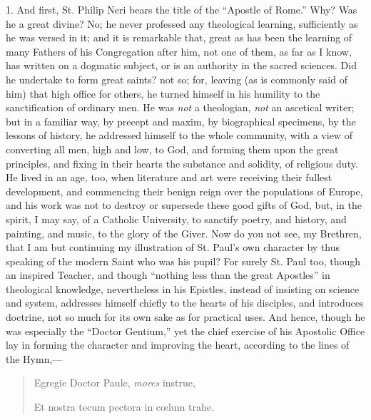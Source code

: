 1. And first, St. Philip Neri bears the title of the
``Apostle of Rome.'' Why? Was he a great divine?
No; he never professed any theological learning,
sufficiently as he was versed in it; and it is remarkable
that, great as has been the learning of many Fathers of
his Congregation after him, not one of them, as far as I
know, has written on a dogmatic subject, or is an
authority in the sacred sciences. Did he undertake to
form great saints? not so; for, leaving (as is commonly
said of him) that high office for others, he turned
himself in his humility to the sanctification of ordinary
men. He was \emph{not} a theologian, \emph{not} an
ascetical writer; but in a familiar way, by precept and
maxim, by biographical specimens, by the lessons of
history, he addressed himself to the whole community,
with a view of converting all men, high and low, to God,
and forming them upon the great principles, and fixing in
their hearts the substance and solidity, of religious
duty. He lived in an age, too, when literature and art
were receiving their fullest development, and commencing
their benign reign over the populations of Europe, and
his work was not to destroy or supersede these good gifts
of God, but, in the spirit, I may say, of a Catholic
University, to sanctify poetry, and history, and
painting, and music, to the glory of the Giver. Now do
you not see, my Brethren, that I am but continuing my
illustration of St. Paul's own character by thus speaking
of the modern Saint who was his pupil? For surely St.
Paul too, though an inspired Teacher, and though
``nothing less than the great Apostles'' in
theological knowledge, nevertheless in his Epistles,
instead of insisting on science and system, addresses
himself chiefly to the hearts of his disciples, and
introduces doctrine, not so much for its own sake as for
practical uses. And hence, though he was especially the
``Doctor Gentium,'' yet the chief exercise of his
Apostolic Office lay in forming the character and
improving the heart, according to the lines of the
Hymn,—

\begin{quote}

Egregie Doctor Paule, \emph{mores} instrue,

Et nostra tecum pectora in cœlum trahe.

\end{quote}

